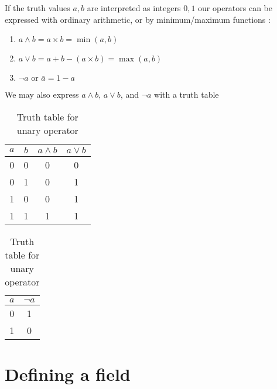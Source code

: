 \documentclass{article}
\begin{document}
If the truth values $a, b$ are interpreted as integers $0, 1$ our operators can
be expressed with ordinary arithmetic, or by minimum/maximum functions
\cite{algebrainterp}:

\begin{enumerate}
  \item $a \wedge b = a \times b = \min(a,b)$
  \item $a \vee b = a + b - (a \times b) = \max(a,b)$
  \item $\neg a\text{ or }\bar{a} = 1 - a$
\end{enumerate}
We may also express $a \wedge b$, $a \vee b$, and $\neg a$ with a truth table

\begin{table}
\parbox{.45\linewidth}{
\centering
\begin{tabular}{@{}c c c c @{}}
\toprule
$a$ & $b$ & $a \wedge b$ & $a \vee b$ \\ \toprule
0   & 0   & 0            & 0          \\ \midrule
0   & 1   & 0            & 1          \\ \midrule
1   & 0   & 0            & 1          \\ \midrule
1   & 1   & 1            & 1          \\ \bottomrule
\end{tabular}
\caption{Truth table for binary operators}
}
\hfill
\parbox{.45\linewidth}{
\centering
\begin{tabular}{@{} c c @{}}
\toprule
$a$ & $\neg a$ \\ \toprule
0   & 1        \\ \midrule
1   & 0        \\ \bottomrule
\end{tabular}
\caption{Truth table for unary operator }
}
\end{table}

\section{Defining a field}
\label{sec:Defining a field}
\end{document}
